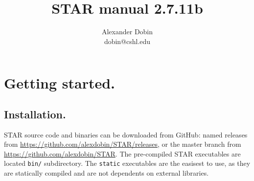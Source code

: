 \documentclass[12pt]{article}
\begin{document}
\hypersetup{
	linkcolor=MidnightBlue
	}


\newcommand{\optn}[1]{\sloppy\textcolor{violet}{\texttt{--#1}}}
\newcommand{\opt}[1]{\sloppy\hyperlink{#1}{\optn{#1}}}
\newcommand{\optv}[1]{\sloppy\texttt{#1}}
\newcommand{\optvr}[1]{\sloppy\textit{\texttt{#1}}}

\newcommand{\code}[1]{\sloppy\texttt{#1}}

\newcommand{\codelines}[1]{\begin{adjustwidth}{0.5in}{0in}
	\raggedright\texttt{#1}
	\end{adjustwidth}}

\newcommand{\ofilen}[1]{\sloppy\texttt{#1}}

\newcommand{\sechyperref}[1]{\hyperref[#1]{Section \ref{#1}. \nameref{#1}}}

\title{STAR manual 2.7.11b}
\author{Alexander Dobin\\
dobin@cshl.edu}
\maketitle

\makeatletter
\renewcommand*\l@subsection{\@dottedtocline{2}{1.8em}{2.7 em}}
\renewcommand*\l@subsubsection{\@dottedtocline{2}{4.5em}{2.7 em}}
\makeatother
\tableofcontents

\newpage

\section{Getting started.}
\subsection{Installation.}

STAR source code and binaries can be downloaded from GitHub: named releases from \url{https://github.com/alexdobin/STAR/releases}, or the master branch from \url{https://github.com/alexdobin/STAR}. The pre-compiled STAR executables are  located \code{bin/} subdirectory. The \code{static} executables are the easisest to use, as they are statically compiled and are not dependents on external libraries.
\end{document}
